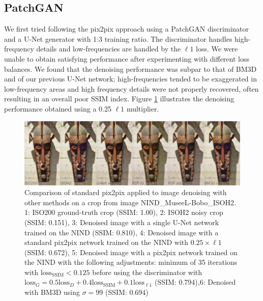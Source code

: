 \subsection{PatchGAN}

We first tried following the pix2pix approach using a PatchGAN discriminator and a U-Net generator \cite{pix2pix} with 1:3 training ratio. The discriminator handles high-frequency details and low-frequencies are handled by the $\ell 1$ loss. We were unable to obtain satisfying performance after experimenting with different loss balances. We found that the denoising performance was subpar to that of \ac{BM3D} and of our previous U-Net network; high-frequencies tended to be exaggerated in low-frequency areas and high frequency details were not properly recovered, often resulting in an overall poor \ac{SSIM} index. Figure \ref{fig:p2p-def} illustrates the denoising performance obtained using a 0.25 $\ell 1$ multiplier.

\begin{figure}[!htbp]
  \begin{center}
    \includegraphics[width=1\linewidth]{gfx/comp/p2p_def.jpg}
    \caption[Initial (c)GAN denoising (visual comparison)]{Comparison of standard pix2pix \cite{pix2pix} applied to image denoising with other methods on a crop from image NIND\_MuseeL-Bobo\_ISOH2. 1: ISO200 ground-truth crop (SSIM: 1.00), 2: ISOH2 noisy crop (SSIM: 0.151), 3: Denoised image with a single U-Net network trained on the \ac{NIND} (SSIM: 0.810), 4: Denoised image with a standard pix2pix network trained on the \ac{NIND} with $0.25\times\ell 1$ (SSIM: 0.672), 5: Denoised image with a pix2pix network trained on the \ac{NIND} with the following adjustments: minimum of 35 iterations with $\text{loss}_\text{SSIM} < 0.125$ before using the discriminator with $\text{loss}_G=0.5 \text{loss}_D + 0.4 \text{loss}_\text{SSIM} + 0.1 \text{loss}_{\ell 1}$ (SSIM: 0.794),6: Denoised with \ac{BM3D} using $\sigma=99$ (SSIM: 0.694)}
    \label{fig:p2p-def}
  \end{center}
\end{figure}

